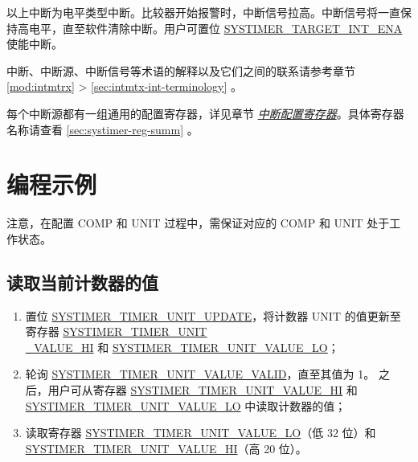 \documentclass[main\_\_CN.tex]{subfiles}
\begin{document}
以上中断为电平类型中断。比较器开始报警时，中断信号拉高。中断信号将一直保持高电平，直至软件清除中断。用户可置位 \hyperref[fielddesc:SYSTIMERTARGET0INTENA]{SYSTIMER\_TARGET\_INT\_ENA} 使能中断。

\begin{tiplisting}
中断、中断源、中断信号等术语的解释以及它们之间的联系请参考章节 \ref{mod:intmtrx} \textit{} > \ref{sec:intmtx-int-terminology} \textit{}。
\end{tiplisting}

每个中断源都有一组通用的配置寄存器，详见章节 \hyperref[interrupt-config-registers]{\textit{中断配置寄存器}}。具体寄存器名称请查看 \ref{sec:systimer-reg-summ} \textit{}。


\section{编程示例}\label{sec:instructions-of-usage}
注意，在配置 COMP 和 UNIT 过程中，需保证对应的 COMP 和 UNIT 处于工作状态。
\subsection{读取当前计数器的值}\label{sec:to-read-system-timer-value}
\begin{enumerate}
    \item 置位 \hyperref[fielddesc:SYSTIMERTIMERUNIT0UPDATE]{SYSTIMER\_TIMER\_UNIT\_UPDATE}，将计数器 UNIT 的值更新至寄存器 \hyperref[fielddesc:SYSTIMERTIMERUNIT0VALUEHI]{SYSTIMER\_TIMER\_UNIT\\\_VALUE\_HI} 和 \hyperref[fielddesc:SYSTIMERTIMERUNIT0VALUELO]{SYSTIMER\_TIMER\_UNIT\_VALUE\_LO}；
    \item 轮询 \hyperref[fielddesc:SYSTIMERTIMERUNIT0VALUEVALID]{SYSTIMER\_TIMER\_UNIT\_VALUE\_VALID}，直至其值为 1。
    之后，用户可从寄存器 \hyperref[fielddesc:SYSTIMERTIMERUNIT0VALUEHI]{SYSTIMER\_TIMER\_UNIT\_VALUE\_HI} 和 \hyperref[fielddesc:SYSTIMERTIMERUNIT0VALUELO]{SYSTIMER\_TIMER\_UNIT\_VALUE\_LO} 中读取计数器的值；
    \item 读取寄存器 \hyperref[fielddesc:SYSTIMERTIMERUNIT0VALUELO]{SYSTIMER\_TIMER\_UNIT\_VALUE\_LO}（低 32 位）和 \hyperref[fielddesc:SYSTIMERTIMERUNIT0VALUEHI]{SYSTIMER\_TIMER\_UNIT\_VALUE\_HI}（高 20 位）。
\end{enumerate}
\end{document}
